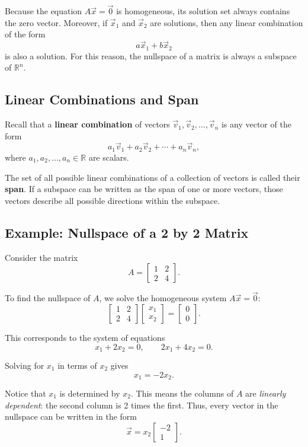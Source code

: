 Because the equation $A\vec{x}=\vec{0}$ is homogeneous, its solution set always contains the zero vector. Moreover, if $\vec{x}_1$ and $\vec{x}_2$ are solutions, then any linear combination of the form
\[
a\vec{x}_1 + b\vec{x}_2
\]
is also a solution. For this reason, the nullspace of a matrix is always a subspace of $\mathbb{R}^n$.

\subsection{Linear Combinations and Span}

Recall that a \textbf{linear combination} of vectors $\vec{v}_1,\vec{v}_2,\ldots,\vec{v}_n$ is any vector of the form
\[
a_1\vec{v}_1 + a_2\vec{v}_2 + \cdots + a_n\vec{v}_n,
\]
where $a_1,a_2,\ldots,a_n \in \mathbb{R}$ are scalars.

The set of all possible linear combinations of a collection of vectors is called their \textbf{span}. If a subspace can be written as the span of one or more vectors, those vectors describe all possible directions within the subspace.

\subsection{Example: Nullspace of a 2 by 2 Matrix}

Consider the matrix
\[
A =
\begin{bmatrix}
1 & 2 \\
2 & 4
\end{bmatrix}.
\]

To find the nullspace of $A$, we solve the homogeneous system $A\vec{x}=\vec{0}$:
\[
\begin{bmatrix}
1 & 2 \\
2 & 4
\end{bmatrix}
\begin{bmatrix}
x_1 \\ x_2
\end{bmatrix}
=
\begin{bmatrix}
0 \\ 0
\end{bmatrix}.
\]

This corresponds to the system of equations
\[
x_1 + 2x_2 = 0,
\qquad
2x_1 + 4x_2 = 0.
\]

Solving for $x_1$ in terms of $x_2$ gives
\[
x_1 = -2x_2.
\]

Notice that $x_1$ is determined by $x_2$. This means the columns of $A$ are \emph{linearly dependent}: the second column is 2 times the first. Thus, every vector in the nullspace can be written in the form
\[
\vec{x} = x_2
\begin{bmatrix}
-2 \\ 1
\end{bmatrix}.
\]

